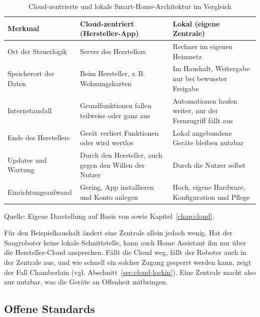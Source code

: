 \begin{table}[htbp]
  \centering
  \caption{Cloud-zentrierte und lokale Smart-Home-Architektur im Vergleich}
  \label{tab:lokal-architektur}
  \footnotesize
  \setlength{\tabcolsep}{4pt}
  \renewcommand{\arraystretch}{1.25}
  \begin{tabularx}{\textwidth}{@{}>{\raggedright\arraybackslash}p{3.2cm}
      >{\raggedright\arraybackslash}X
      >{\raggedright\arraybackslash}X@{}}
    \toprule
    \textbf{Merkmal} & \textbf{Cloud-zentriert (Hersteller-App)}
      & \textbf{Lokal (eigene Zentrale)} \\
    \midrule
    Ort der Steuerlogik & Server des Herstellers
      & Rechner im eigenen Heimnetz \\
    Speicherort der Daten & Beim Hersteller, z.\,B. Wohnungskarten
      & Im Haushalt, Weitergabe nur bei bewusster Freigabe \\
    Internetausfall & Grundfunktionen fallen teilweise oder ganz aus
      & Automationen laufen weiter, nur der Fernzugriff fällt aus \\
    Ende des Herstellers & Gerät verliert Funktionen oder wird wertlos
      & Lokal angebundene Geräte bleiben nutzbar \\
    Updates und Wartung & Durch den Hersteller, auch gegen den Willen
      der Nutzer & Durch die Nutzer selbst \\
    Einrichtungsaufwand & Gering, App installieren und Konto anlegen
      & Hoch, eigene Hardware, Konfiguration und Pflege \\
    \bottomrule
  \end{tabularx}
  \par\smallskip
  \raggedright\scriptsize
  Quelle: Eigene Darstellung auf Basis von
  \cite{homeassistant:2021,homeassistant:oj,openhab:oj} sowie
  Kapitel~\ref{chap:cloud}.
\end{table}

Für den Beispielhaushalt ändert eine Zentrale allein jedoch wenig. Hat der
Saugroboter keine lokale Schnittstelle, kann auch Home Assistant ihn nur über
die Hersteller-Cloud ansprechen. Fällt die Cloud weg, fällt der Roboter auch
in der Zentrale aus, und wie schnell ein solcher Zugang gesperrt werden kann,
zeigt der Fall Chamberlain (vgl. Abschnitt~\ref{sec:cloud-lockin}). Eine
Zentrale macht also nur nutzbar, was die Geräte an Offenheit mitbringen.

\subsection{Offene Standards}\label{sec:lokal-standards}

